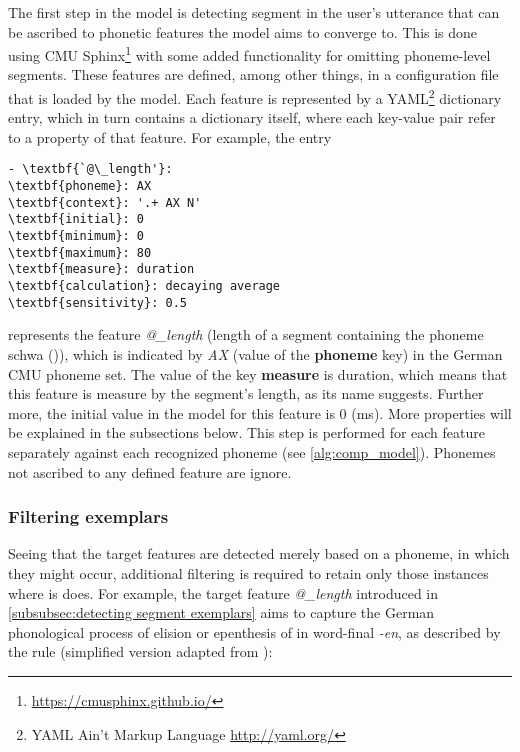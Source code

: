The first step in the model is detecting segment in the user's utterance that can be ascribed to phonetic features the model aims to converge to.
This is done using CMU Sphinx\footnote{\url{https://cmusphinx.github.io/}} with some added functionality for omitting phoneme-level segments.
These features are defined, among other things, in a configuration file that is loaded by the model.
Each feature is represented by a YAML\footnote{YAML Ain't Markup Language \url{http://yaml.org/}} dictionary entry, which in turn contains a dictionary itself, where each key-value pair refer to a property of that feature.
For example, the entry

\begin{Verbatim}[tabsize=4, commandchars=\\\{\}]
- \textbf{`@\_length'}:
\textbf{phoneme}: AX
\textbf{context}: '.+ AX N'
\textbf{initial}: 0
\textbf{minimum}: 0
\textbf{maximum}: 80
\textbf{measure}: duration
\textbf{calculation}: decaying average
\textbf{sensitivity}: 0.5
\end{Verbatim}
\noindent
represents the feature \textit{@\_length} (length of a segment containing the phoneme schwa ()), which is indicated by \textit{AX} (value of the \textbf{phoneme} key) in the German CMU phoneme set.
The value of the key \textbf{measure} is duration, which means that this feature is measure by the segment's length, as its name suggests.
Further more, the initial value in the model for this feature is 0 (\si{\milli\second}).
More properties will be explained in the subsections below.
This step is performed for each feature separately against each recognized phoneme (see \cref{alg:comp_model}).
Phonemes not ascribed to any defined feature are ignore.

\subsubsection{Filtering exemplars}
\label{subsubsec:filtering_exemplars}

Seeing that the target features are detected merely based on a phoneme, in which they might occur, additional filtering is required to retain only those instances where is does.
For example, the target feature \textit{@\_length} introduced in \cref{subsubsec:detecting segment exemplars} aims to capture the German phonological process of elision or epenthesis of  in word-final \textit{-en}, as described by the rule (simplified version adapted from \citet[pp.\,142--143]{Benware1986phonetics}):

